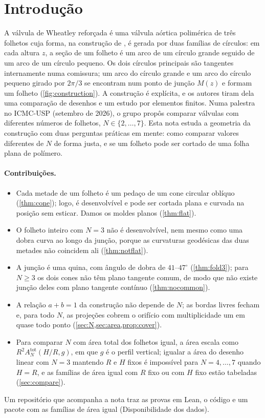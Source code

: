 \documentclass[11pt,a4paper]{article}
\theoremstyle{plain}
\theoremstyle{remark}
\begin{document}
\section{Introdução}\label{sec:intro}

A válvula de Wheatley reforçada é uma válvula aórtica polimérica de três folhetos cuja forma, na construção de
\citet{McKee2026}, é gerada por duas famílias de círculos: em cada altura $z$, a seção de um folheto é um arco de um círculo
grande seguido de um arco de um círculo pequeno. Os dois círculos principais são tangentes internamente numa comissura; um arco
do círculo grande e um arco do círculo pequeno girado por $2\pi/3$ se encontram num ponto de junção $M(z)$ e formam um folheto
(\cref{fig:construction}). A construção é explícita, e os autores tiram dela uma
comparação de desenhos e um estudo por elementos finitos. Numa palestra no ICMC-USP (setembro de 2026), o grupo propôs
comparar válvulas com diferentes números de folhetos, $N\in\{2,\dots,7\}$. Esta nota estuda a geometria da construção com
duas perguntas práticas em mente: como comparar valores diferentes de $N$ de forma justa, e se um folheto pode ser cortado de
uma folha plana de polímero.

\paragraph{Contribuições.}
\begin{itemize}
\item Cada metade de um folheto é um pedaço de um cone circular oblíquo (\cref{thm:cone}); logo, é desenvolvível e pode ser
  cortada plana e curvada na posição sem esticar. Damos os moldes planos (\cref{thm:flat}).
\item O folheto inteiro com $N=3$ não é desenvolvível, nem mesmo como uma dobra curva ao longo da junção, porque as curvaturas
  geodésicas das duas metades não coincidem ali (\cref{thm:notflat}).
\item A junção é uma quina, com ângulo de dobra de $41$--$47^\circ$ (\cref{thm:fold3}); para $N\ge3$ os dois cones não têm
  plano tangente comum, de modo que não existe junção deles com plano tangente contínuo (\cref{thm:nocommon}).
\item A relação $a+b=1$ da construção não depende de $N$; as bordas livres fecham e, para todo $N$, as projeções cobrem o
  orifício com multiplicidade um em quase todo ponto (\cref{sec:N,sec:area,prop:cover}).
\item Para comparar $N$ com área total dos folhetos igual, a área escala como $R^2A^{\mathrm{tot}}_N(H/R,g)$, em que $g$ é o
  perfil vertical; igualar a área do desenho linear com $N=3$ mantendo $R$ e $H$ fixos é impossível para $N=4,\dots,7$ quando
  $H=R$, e as famílias de área igual com $R$ fixo ou com $H$ fixo estão tabeladas (\cref{sec:compare}).
\end{itemize}
Um repositório que acompanha a nota traz as provas em Lean, o código e um pacote com as famílias de área igual
(Disponibilidade dos dados).
\end{document}
